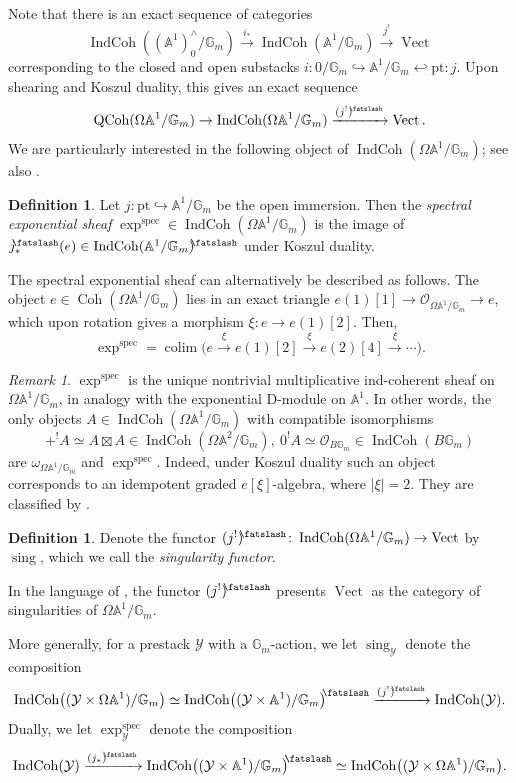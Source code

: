 \documentclass[11pt]{amsart}
\newcommand{\shear}{{\mathbin{\mkern-6mu\fatslash}}}
\newcommand{\bG}{\mathbb{G}}
\newcommand{\bA}{\mathbb{A}}
\newcommand{\cO}{{\mathcal O}}
\newcommand{\spec}{\mathrm{spec}}
\newcommand{\Coh}{\operatorname{Coh}}
\newcommand{\Vect}{\operatorname{Vect}}
\newcommand{\sing}{\operatorname{sing}}
\DeclareMathOperator{\QCoh}{QCoh}
\DeclareMathOperator{\IndCoh}{IndCoh}
\theoremstyle{remark}
\newtheorem*{remark}{Remark}
\theoremstyle{definition}
\newtheorem{defn}[thm]{Definition}
\begin{document}
Note that there is an exact sequence of categories
\[
\IndCoh((\bA^1)^\land_0/\bG_m)\xrightarrow{i_*}\IndCoh(\bA^1/\bG_m)\xrightarrow{j^!}\Vect
\]
corresponding to the closed and open substacks $i\colon 0/\bG_m\hookrightarrow\bA^1/\bG_m\hookleftarrow\mathrm{pt}: \!j$. Upon shearing and Koszul duality, this gives an exact sequence
\[
\QCoh(\Omega\bA^1/\bG_m)\to\IndCoh(\Omega\bA^1/\bG_m)\xrightarrow{(j^!)^\shear}\Vect.
\]
We are particularly interested in the following object of $\IndCoh(\Omega\bA^1/\bG_m)$; see also \cite[\S{}A.2]{relative-langlands}.
\begin{defn}\label{def:spectral-exponential}
    Let $j\colon\mathrm{pt}\hookrightarrow\bA^1/\bG_m$ be the open immersion. Then the \emph{spectral exponential sheaf} $\exp^\spec\in\IndCoh(\Omega\bA^1/\bG_m)$ is the image of $j_*^\shear(e)\in\IndCoh(\bA^1/\bG_m)^\shear$ under Koszul duality.
\end{defn}
The spectral exponential sheaf can alternatively be described as follows. The object $e\in\Coh(\Omega\bA^1/\bG_m)$ lies in an exact triangle $e(1)[1]\to\cO_{\Omega\bA^1/\bG_m}\to e$, which upon rotation gives a morphism $\xi\colon e\to e(1)[2]$. Then,
\[
\exp^\spec=\operatorname{colim}\big(e\xrightarrow\xi e(1)[2]\xrightarrow\xi e(2)[4]\xrightarrow\xi\cdots\big).
\]
\begin{remark}
    $\exp^\spec$ is the unique nontrivial multiplicative ind-coherent sheaf on $\Omega\bA^1/\bG_m$, in analogy with the exponential D-module on $\bA^1$. In other words, the only objects $A\in\IndCoh(\Omega\bA^1/\bG_m)$ with compatible isomorphisms
    \[+^!A\simeq A\boxtimes A\in\IndCoh(\Omega\bA^2/\bG_m),\ 
    0^!A\simeq\cO_{B\bG_m}\in\IndCoh(B\bG_m)\]
are $\omega_{\Omega\bA^1/\bG_m}$ and $\exp^\spec$. Indeed, under Koszul duality such an object corresponds to an idempotent graded $e[\xi]$-algebra, where $|\xi|=2$. They are classified by \cite{localizing}.
\end{remark}
\begin{defn}
    Denote the functor $(j^!)^\shear\colon\IndCoh(\Omega\bA^1/\bG_m)\to\Vect$ by $\sing$, which we call the \emph{singularity functor}.
\end{defn}
In the language of \cite[\S H.2]{singular-support}, the functor $(j^!)^\shear$ presents $\Vect$ as the category of singularities of $\Omega\bA^1/\bG_m$.

More generally, for a prestack $\mathcal Y$ with a $\bG_m$-action, we let $\sing_{\mathcal Y}$ denote the composition
\begin{equation}\label{eq:singularity-functor}
\IndCoh\!\big((\mathcal Y\times\Omega\bA^1)/\bG_m\big)\simeq\IndCoh\!\big((\mathcal Y\times\bA^1)/\bG_m\big)^\shear\xrightarrow{(j^!)^\shear}\IndCoh(\mathcal Y).
\end{equation}
Dually, we let $\exp^\spec_{\mathcal Y}$ denote the composition
\begin{equation}\label{eq:singularity-functor2}
\IndCoh(\mathcal Y)\xrightarrow{(j_*)^\shear}\IndCoh\!\big((\mathcal Y\times\bA^1)/\bG_m\big)^\shear\simeq
\IndCoh\!\big((\mathcal Y\times\Omega\bA^1)/\bG_m\big).
\end{equation}
\end{document}
